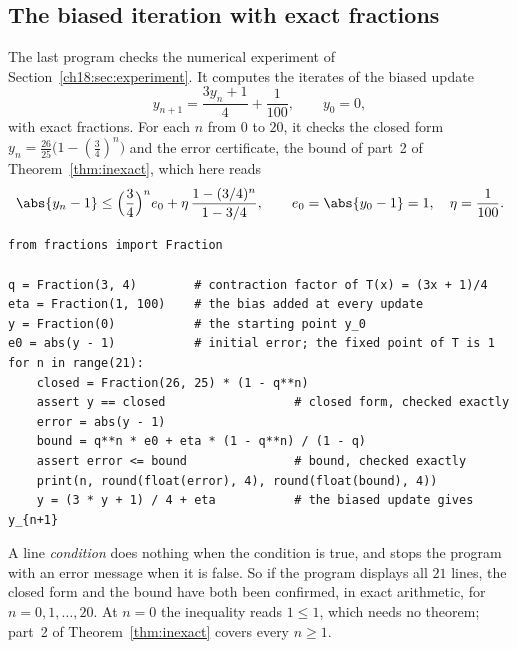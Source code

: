 \subsection*{The biased iteration with exact fractions}
The last program checks the numerical experiment of Section~\ref{ch18:sec:experiment}. It computes the iterates of the biased update
\[
y_{n+1}=\frac{3y_n+1}{4}+\frac1{100},\qquad y_0=0,
\]
with exact fractions. For each $n$ from $0$ to $20$, it checks the closed form $y_n=\frac{26}{25}\bigl(1-(\frac34)^n\bigr)$ and the error certificate, the bound of part~2 of Theorem~\ref{thm:inexact}, which here reads
\[
\abs{y_n-1}\le\Bigl(\frac34\Bigr)^n e_0+\eta\,\frac{1-(3/4)^n}{1-3/4},
\qquad e_0=\abs{y_0-1}=1,\quad \eta=\frac1{100}.
\]
\begin{lstlisting}
from fractions import Fraction

q = Fraction(3, 4)        # contraction factor of T(x) = (3x + 1)/4
eta = Fraction(1, 100)    # the bias added at every update
y = Fraction(0)           # the starting point y_0
e0 = abs(y - 1)           # initial error; the fixed point of T is 1
for n in range(21):
    closed = Fraction(26, 25) * (1 - q**n)
    assert y == closed                  # closed form, checked exactly
    error = abs(y - 1)
    bound = q**n * e0 + eta * (1 - q**n) / (1 - q)
    assert error <= bound               # bound, checked exactly
    print(n, round(float(error), 4), round(float(bound), 4))
    y = (3 * y + 1) / 4 + eta           # the biased update gives y_{n+1}
\end{lstlisting}
A line  \emph{condition} does nothing when the condition is true, and stops the program with an error message when it is false. So if the program displays all $21$ lines, the closed form and the bound have both been confirmed, in exact arithmetic, for $n=0,1,\ldots,20$. At $n=0$ the inequality reads $1\le1$, which needs no theorem; part~2 of Theorem~\ref{thm:inexact} covers every $n\ge1$.

